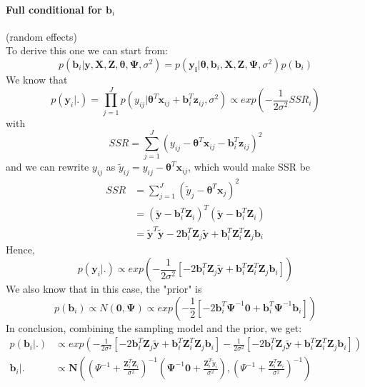 \documentclass[a4paper]{article}
\begin{document}
\paragraph{Full conditional for $\bm{b}_{i}$} (random effects)\\

To derive this one we can start from:
 \begin{equation*}
	p(\bm{b}_{i}|\bm{y}, \bm{X}, \bm{Z}, \bm{\theta}, \bm{\Psi}, \sigma^2) = 	p(\bm{y_{i}}|\bm{\theta}, \bm{b}_{i}, \bm{X}, \bm{Z}, \bm{\Psi}, \sigma^2) p(\bm{b}_{i})
 \end{equation*}
We know that
 \begin{equation*}
	p(\bm{y}_{i}|.) = \prod_{j=1}^{J}p(y_{ij}|\bm{\theta}^{T}\bm{x}_{ij} + \bm{b}_{i}^{T}\bm{z}_{ij}, \sigma^2) \propto exp(-\frac{1}{2\sigma^2}SSR_{i})
 \end{equation*}
with
 \begin{equation*}
	SSR = \sum_{j = 1}^{J}( y_{ij}-\bm{\theta}^{T}\bm{x}_{ij} - \bm{b}_{i}^{T}\bm{z}_{ij})^2
 \end{equation*}
and we can rewrite $y_{ij}$ as $\tilde{y}_{ij} = y_{ij} - \bm{\theta}^{T}\bm{x}_{ij}$, which would make SSR be\\
 \begin{equation*}
  \begin{split}
	SSR& = \sum_{j = 1}^{J}( \tilde{y}_{j}-\bm{\theta}^{T}\bm{x}_{j})^2\\
	&= ( \tilde{\bm{y}} - \bm{b}_{i}^{T}\bm{Z}_{i})^{T}( \tilde{\bm{y}} - \bm{b}_{i}^{T}\bm{Z}_{i})\\
	&= \tilde{\bm{y}}^{T}\tilde{\bm{y}} - 2\bm{b}_{i}^{T}\bm{Z}_{j}\tilde{\bm{y}} + \bm{b}_{i}^{T}\bm{Z}^{T}_{i} \bm{Z}_{j}\bm{b}_{i}
  \end{split}
 \end{equation*}
Hence,
 \begin{equation*}
	p(\bm{y}_{i}|.) \propto exp(-\frac{1}{2\sigma^2}[- 2\bm{b}_{i}^{T}\bm{Z}_{j}\tilde{\bm{y}} + \bm{b}_{i}^{T}\bm{Z}^{T}_{i} \bm{Z}_{j}\bm{b}_{i}])
 \end{equation*}
We also know that in this case, the "prior" is
 \begin{equation*}
	p(\bm{b}_{i}) \propto N(\bm{0}, \bm{\Psi}) \propto exp(-\frac{1}{2}[-2\bm{b}_{i}^{T}\bm{\Psi}^{-1}\bm{0} + \bm{b}_{i}^{T}\bm{\Psi}^{-1}\bm{b}_{i}])
 \end{equation*}
In conclusion, combining the sampling model and the prior, we get:
 \begin{equation}
  \begin{split}
	p(\bm{b}_{i}|.)& \propto 	
	exp(
	-\frac{1}{2\sigma^2}[- 2\bm{b}_{i}^{T}\bm{Z}_{j}\tilde{\bm{y}} + \bm{b}_{i}^{T}\bm{Z}^{T}_{i} \bm{Z}_{j}\bm{b}_{i}]
	-\frac{1}{2\sigma^2}[- 2\bm{b}_{i}^{T}\bm{Z}_{j}\tilde{\bm{y}} + \bm{b}_{i}^{T}\bm{Z}^{T}_{i} \bm{Z}_{j}\bm{b}_{i}])\\
	\bm{b}_{i}|.& \propto \bm{N}\left(\left(\Psi^{-1} + \frac{\bm{Z}_{i}^{T}\bm{Z}_{i}}{\sigma^2}\right)^{-1}\left(\bm{\Psi}^{-1}\bm{0}+\frac{\bm{Z}_{i}^{T}\tilde{y}_{i}}{\sigma^2}\right), \left(\Psi^{-1} + \frac{\bm{Z}_{i}^{T}\bm{Z}_{i}}{\sigma^2}\right)^{-1}\right)
  \end{split}
 \end{equation}
\end{document}
